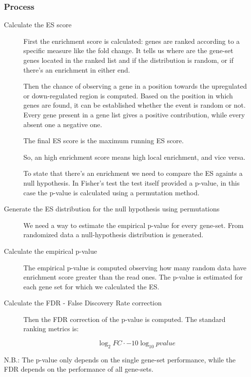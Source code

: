 		\subsubsection{Process}
		\begin{description}
		\item[Calculate the ES score]
		First the enrichment score is calculated: genes are ranked according to a specific measure like the fold change.
		It tells us where are the gene-set genes located in the ranked list and if the distribution is random, or if there's an enrichment in either end.
		
		Then the chance of observing a gene in a position towards the upregulated or down-regulated region is computed.
		Based on the position in which genes are found, it can be established whether the event is random or not.
		Every gene present in a gene list gives a positive contribution, while every absent one a negative one.
		
		The final ES score is the maximum running ES score.
		
		So, an high enrichment score means high local enrichment, and vice versa.
		
		To state that there's an enrichment we need to compare the ES againts a null hypothesis. 
		In Fisher's test the test itself provided a p-value, in this case the p-value is calculated using a permutation method.
		
		\item[Generate the ES distribution for the null hypothesis using permutations]
		We need a way to estimate the empirical p-value for every gene-set.
		From randomized data a null-hypothesis distribution is generated. 
		
	
		\item[Calculate the empirical p-value]
		The empirical p-value is computed observing how many random data have enrichment score greater than the read ones.
		The p-value is estimated for each gene set for which we calculated the ES.
		
		\item[Calculate the FDR - False Discovery Rate correction]
		
			Then the FDR correction of the p-value is computed.
		The standard ranking metrics is:

		$$\log_2 FC\cdot -10\log_{10} pvalue$$
		
		\end{description}
		
		N.B.: The p-value only depends on the single gene-set performance, while the FDR depends on the performance of all gene-sets.

